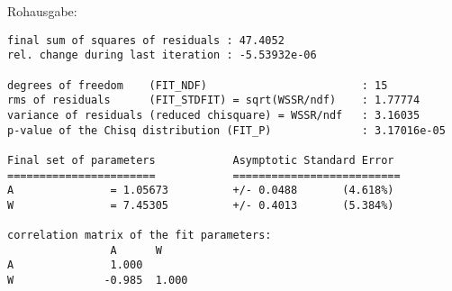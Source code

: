     \vspace{-\baselineskip}
    Rohausgabe:
    \begin{verbatim}
final sum of squares of residuals : 47.4052
rel. change during last iteration : -5.53932e-06

degrees of freedom    (FIT_NDF)                        : 15
rms of residuals      (FIT_STDFIT) = sqrt(WSSR/ndf)    : 1.77774
variance of residuals (reduced chisquare) = WSSR/ndf   : 3.16035
p-value of the Chisq distribution (FIT_P)              : 3.17016e-05

Final set of parameters            Asymptotic Standard Error
=======================            ==========================
A               = 1.05673          +/- 0.0488       (4.618%)
W               = 7.45305          +/- 0.4013       (5.384%)

correlation matrix of the fit parameters:
                A      W      
A               1.000 
W              -0.985  1.000 
    \end{verbatim}